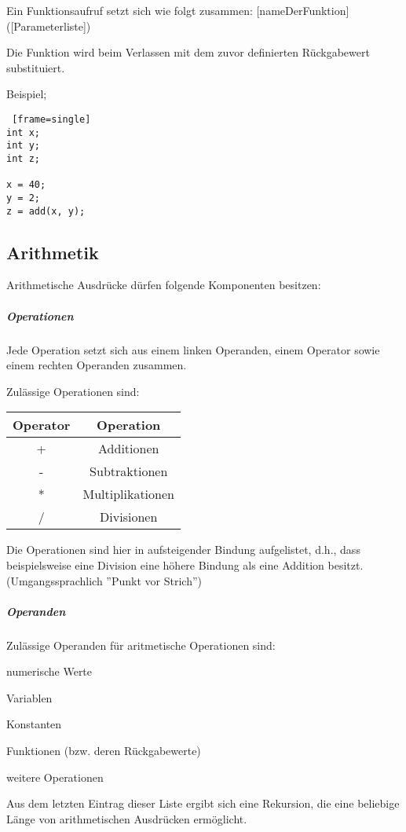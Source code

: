 Ein Funktionsaufruf setzt sich wie folgt zusammen:
[nameDerFunktion]([Parameterliste])

Die Funktion wird beim Verlassen mit dem zuvor definierten Rückgabewert substituiert.

Beispiel;
\begin{lstlisting} [frame=single] 
int x;
int y;
int z;

x = 40;
y = 2;
z = add(x, y);
\end{lstlisting}

\subsection{Arithmetik}
Arithmetische Ausdrücke dürfen folgende Komponenten besitzen:

\subparagraph{Operationen}
Jede Operation setzt sich aus einem linken Operanden, einem Operator sowie einem rechten Operanden zusammen.

Zulässige Operationen sind:
\begin{center}
  \begin{tabular}{ | c | c | }
    \hline
    Operator & Operation\\ \hline \hline
    + & Additionen\\ \hline
    - & Subtraktionen\\ \hline
    * & Multiplikationen\\ \hline
    / & Divisionen\\ \hline
  \end{tabular}
\end{center}
Die Operationen sind hier in aufsteigender Bindung aufgelistet, d.h., dass beispielsweise eine Division eine höhere Bindung als eine Addition besitzt. (Umgangssprachlich ''Punkt vor Strich'')

\subparagraph{Operanden}
Zulässige Operanden für aritmetische Operationen sind:

\begin{list}{•}
\item numerische Werte \item
\item Variablen
\item Konstanten
\item Funktionen (bzw. deren Rückgabewerte)
\item weitere Operationen
\end{list}

Aus dem letzten Eintrag dieser Liste ergibt sich eine Rekursion, die eine beliebige Länge von arithmetischen Ausdrücken ermöglicht.


